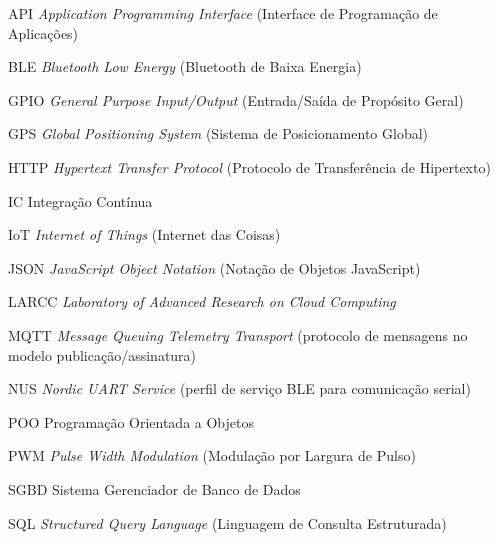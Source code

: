 \documentclass[
    12pt,               %
    openany,            %
    oneside,            %
    a4paper,            %
    chapter=TITLE,      %
    section=TITLE,      %
    english,            %
    brazil,             %
    ]{abntex2}
\begin{document}
\begin{siglas}
  \item[API] \textit{Application Programming Interface} (Interface de Programação de Aplicações)
  \item[BLE] \textit{Bluetooth Low Energy} (Bluetooth de Baixa Energia)
  \item[GPIO] \textit{General Purpose Input/Output} (Entrada/Saída de Propósito Geral)
  \item[GPS] \textit{Global Positioning System} (Sistema de Posicionamento Global)
  \item[HTTP] \textit{Hypertext Transfer Protocol} (Protocolo de Transferência de Hipertexto)
  \item[IC] Integração Contínua
  \item[IoT] \textit{Internet of Things} (Internet das Coisas)
  \item[JSON] \textit{JavaScript Object Notation} (Notação de Objetos JavaScript)
  \item[LARCC] \textit{Laboratory of Advanced Research on Cloud Computing}
  \item[MQTT] \textit{Message Queuing Telemetry Transport} (protocolo de mensagens no modelo publicação/assinatura)
  \item[NUS] \textit{Nordic UART Service} (perfil de serviço BLE para comunicação serial)
  \item[POO] Programação Orientada a Objetos
  \item[PWM] \textit{Pulse Width Modulation} (Modulação por Largura de Pulso)
  \item[SGBD] Sistema Gerenciador de Banco de Dados
  \item[SQL] \textit{Structured Query Language} (Linguagem de Consulta Estruturada)
\end{siglas}
\cleardoublepage

\vspace*{138pt}
\tableofcontents*
\cleardoublepage

\textual







\postextual
\end{document}
